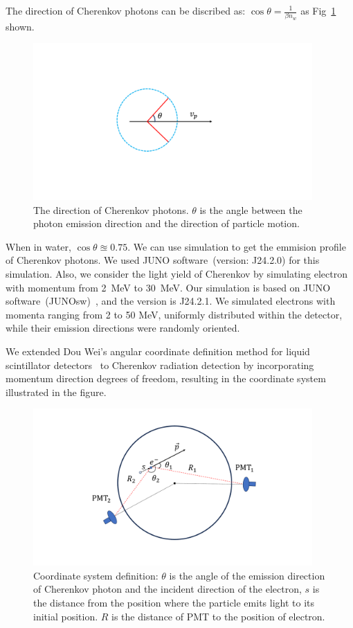 The direction of Cherenkov photons can be discribed as: $\cos\theta=\frac{1}{\beta n_w}$ as Fig~\ref{Fig:Cherenkov_emmision} shown.

\begin{figure}
	\begin{center}
		\includegraphics[height=6cm]{reconstruction/cherenkov_emission.pdf}
	\end{center}
	\caption{The direction of Cherenkov photons. $\theta$ is the angle between the photon emission direction and the direction of particle motion.}
	\label{Fig:Cherenkov_emmision}
\end{figure}

When in water, $\cos\theta\approxeq0.75$. We can use simulation to get the emmision profile of Cherenkov photons. We used JUNO software~(version: J24.2.0) for this simulation. Also, we consider the light yield of Cherenkov by simulating electron with momentum from \SI{2}{MeV} to \SI{30}{MeV}. Our simulation is based on JUNO software~(JUNOsw)~\cite{junosw}, and the version is J24.2.1. We simulated electrons with momenta ranging from 2 to 50 MeV, uniformly distributed within the detector, while their emission directions were randomly oriented.

We extended Dou Wei's angular coordinate definition method for liquid scintillator detectors~\cite{Dou:2022} to Cherenkov radiation detection by incorporating momentum direction degrees of freedom, resulting in the coordinate system illustrated in the figure.

\begin{figure}
	\begin{center}
		\includegraphics[height=6cm]{reconstruction/zuobiao.pdf}
	\end{center}
	\caption{Coordinate system definition: $\theta$ is the angle of the emission direction of Cherenkov photon and the incident direction of the electron, $s$ is the distance from the position where the particle emits light to its initial position. $R$ is the distance of PMT to the position of electron.}
	\label{Fig:Coordinate}
\end{figure}

